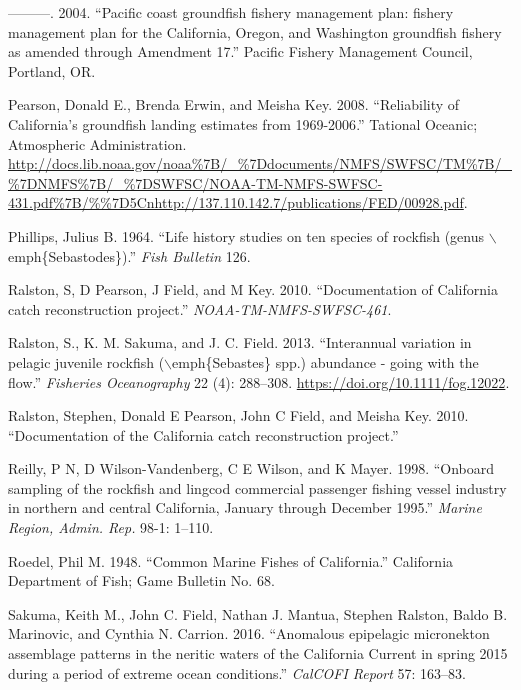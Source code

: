 \documentclass[
  english,
  a4paper,
]{article}
\newlength{\cslhangindent}
\newlength{\cslentryspacingunit} %
\newenvironment{CSLReferences}[2] %
 {%
  \setlength{\parindent}{0pt}
  \ifodd #1
  \let\oldpar\par
  \def\par{\hangindent=\cslhangindent\oldpar}
  \fi
  \setlength{\parskip}{#2\cslentryspacingunit}
 }%
 {}
\begin{document}
\begin{CSLReferences}{1}{0}
\leavevmode{}%
---------. 2004. {``{Pacific coast groundfish fishery management plan: fishery management plan for the California, Oregon, and Washington groundfish fishery as amended through Amendment 17}.''} Pacific Fishery Management Council, Portland, OR.

\leavevmode{}%
Pearson, Donald E., Brenda Erwin, and Meisha Key. 2008. {``{Reliability of California's groundfish landing estimates from 1969-2006}.''} Tational Oceanic; Atmospheric Administration. \url{http://docs.lib.noaa.gov/noaa\%7B/_\%7Ddocuments/NMFS/SWFSC/TM\%7B/_\%7DNMFS\%7B/_\%7DSWFSC/NOAA-TM-NMFS-SWFSC-431.pdf\%7B/\%\%7D5Cnhttp://137.110.142.7/publications/FED/00928.pdf}.

\leavevmode{}%
Phillips, Julius B. 1964. {``{Life history studies on ten species of rockfish (genus \(\backslash\)emph{\{}Sebastodes{\}})}.''} \emph{Fish Bulletin} 126.

\leavevmode{}%
Ralston, S, D Pearson, J Field, and M Key. 2010. {``{Documentation of California catch reconstruction project.}''} \emph{NOAA-TM-NMFS-SWFSC-461}.

\leavevmode{}%
Ralston, S., K. M. Sakuma, and J. C. Field. 2013. {``{Interannual variation in pelagic juvenile rockfish (\(\backslash\)emph{\{}Sebastes{\}} spp.) abundance - going with the flow}.''} \emph{Fisheries Oceanography} 22 (4): 288--308. \url{https://doi.org/10.1111/fog.12022}.

\leavevmode{}%
Ralston, Stephen, Donald E Pearson, John C Field, and Meisha Key. 2010. {``{Documentation of the California catch reconstruction project}.''}

\leavevmode{}%
Reilly, P N, D Wilson-Vandenberg, C E Wilson, and K Mayer. 1998. {``{Onboard sampling of the rockfish and lingcod commercial passenger fishing vessel industry in northern and central California, January through December 1995.}''} \emph{Marine Region, Admin. Rep.} 98-1: 1--110.

\leavevmode{}%
Roedel, Phil M. 1948. {``{Common Marine Fishes of California}.''} California Department of Fish; Game Bulletin No. 68.

\leavevmode{}%
Sakuma, Keith M., John C. Field, Nathan J. Mantua, Stephen Ralston, Baldo B. Marinovic, and Cynthia N. Carrion. 2016. {``{Anomalous epipelagic micronekton assemblage patterns in the neritic waters of the California Current in spring 2015 during a period of extreme ocean conditions}.''} \emph{CalCOFI Report} 57: 163--83.


\end{CSLReferences}
\end{document}
